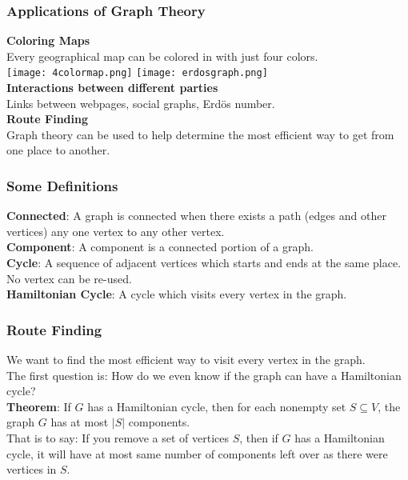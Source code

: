 \documentclass{beamer}
\begin{document}
\begin{frame}
\frametitle{Applications of Graph Theory}
\pause
\textbf{Coloring Maps} \\  %
Every geographical map can be colored in with just four colors.\\
\texttt{[image: 4colormap.png]} \hspace{3mm}
\pause
\texttt{[image: erdosgraph.png]} \\
\textbf{Interactions between different parties} \\ %
Links between webpages, social graphs, Erd\"{o}s number. \\
\pause
\textbf{Route Finding} \\
Graph theory can be used to help determine the most efficient way to get from one place to another.
\end{frame}


\begin{frame}
\frametitle{Some Definitions}
\textbf{Connected}:  A graph is connected when there exists a path (edges and other vertices) any one vertex to any other vertex. \\
\pause
\vspace{3mm}
\textbf{Component}:  A component is a connected portion of a graph. \\
\pause
\vspace{3mm}
\textbf{Cycle}: A sequence of adjacent vertices which starts and ends at the same place.  No vertex can be re-used. \\
\pause
\vspace{3mm}
\textbf{Hamiltonian Cycle}: A cycle which visits every vertex in the graph.
\end{frame}

\begin{frame}
\frametitle{Route Finding}
We want to find the most efficient way to visit every vertex in the graph. \\ 
\pause
\vspace{2mm}
The first question is:  How do we even know if the graph can have a Hamiltonian cycle? \\
\pause
\vspace{5mm}
\textbf{Theorem}: If $G$ has a Hamiltonian cycle, then for each nonempty set $S \subseteq V$, the graph $G$ has at most $|S|$ components. \\
\pause
\vspace{5mm}
That is to say: If you remove a set of vertices $S$, then if $G$ has a Hamiltonian cycle, it will have at most same number of components left over as there were vertices in $S$.
\end{frame}
\end{document}
